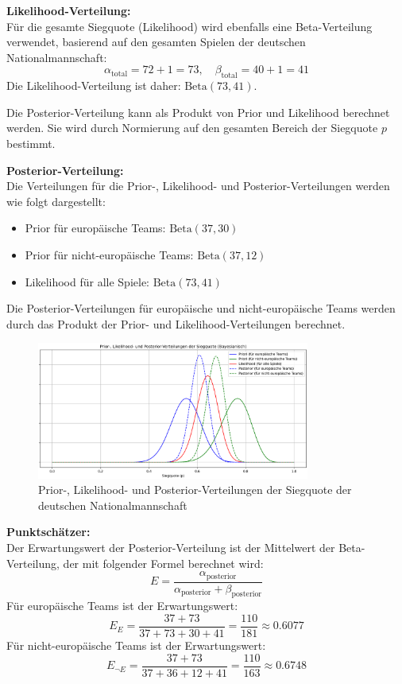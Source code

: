 \documentclass[a4paper,12pt]{article}
\begin{document}
\textbf{Likelihood-Verteilung:} \\
Für die gesamte Siegquote (Likelihood) wird ebenfalls eine Beta-Verteilung verwendet, basierend auf den gesamten Spielen der deutschen Nationalmannschaft:
\[
\alpha_{\text{total}} = 72 + 1 = 73, \quad \beta_{\text{total}} = 40 + 1 = 41
\]
Die Likelihood-Verteilung ist daher: \( \text{Beta}(73, 41) \).

Die Posterior-Verteilung kann als Produkt von Prior und Likelihood berechnet werden. Sie wird durch Normierung auf den gesamten Bereich der Siegquote \( p \) bestimmt.

\textbf{Posterior-Verteilung:} \\
Die Verteilungen für die Prior-, Likelihood- und Posterior-Verteilungen werden wie folgt dargestellt:

\begin{itemize}
  \item Prior für europäische Teams: \( \text{Beta}(37, 30) \)
  \item Prior für nicht-europäische Teams: \( \text{Beta}(37, 12) \)
  \item Likelihood für alle Spiele: \( \text{Beta}(73, 41) \)
\end{itemize}

Die Posterior-Verteilungen für europäische und nicht-europäische Teams werden durch das Produkt der Prior- und Likelihood-Verteilungen berechnet.

\begin{figure}[htbp]
  \centering
  \includegraphics[width=0.8\textwidth]{../images/world_cup.png}
  \caption{Prior-, Likelihood- und Posterior-Verteilungen der Siegquote der deutschen Nationalmannschaft}
\end{figure}

\textbf{Punktschätzer:} \\
Der Erwartungswert der Posterior-Verteilung ist der Mittelwert der Beta-Verteilung, der mit folgender Formel berechnet wird:
\[
E = \frac{\alpha_{\text{posterior}}}{\alpha_{\text{posterior}} + \beta_{\text{posterior}}}
\]
Für europäische Teams ist der Erwartungswert:
\[
E_E = \frac{37 + 73}{37 + 73 + 30 + 41} = \frac{110}{181} \approx 0.6077
\]
Für nicht-europäische Teams ist der Erwartungswert:
\[
E_{\neg E}= \frac{37 + 73}{37 + 36 + 12 + 41} = \frac{110}{163} \approx 0.6748
\]
\end{document}
